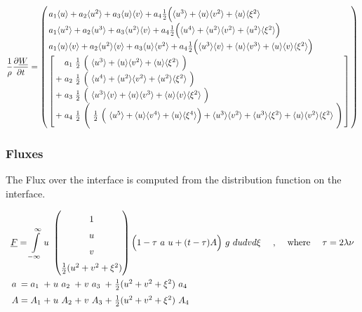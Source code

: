 \documentclass[
	pdftex,             %
	12pt,				%
	a4paper,		   	%
	english,				%
	oneside,			%
]{article}
\newcommand{\mom}[1]{\langle #1 \rangle}
\newcommand{\uu}[1]{\underline{#1}}
\begin{document}
\begin{equation}
\arraycolsep=1.4pt\def\arraystretch{1.5}
\dfrac{1}{\rho}\dfrac{\partial \uu{W}}{\partial t} = 
\left(
\begin{array}{l}
        a_1 \mom{u} + a_2 \mom{u^2} + a_3 \mom{u}\mom{v}
    +   a_4 \frac{1}{2} \Big( \mom{u^3} + \mom{u}\mom{v^2} + \mom{u}\mom{\xi^2}
    \\
        a_1 \mom{u^2} + a_2 \mom{u^3} + a_3 \mom{u^2}\mom{v}
    +   a_4 \frac{1}{2} \Big( \mom{u^4} + \mom{u^2}\mom{v^2} + \mom{u^2}\mom{\xi^2} \Big)
    \\
        a_1 \mom{u}\mom{v} + a_2 \mom{u^2}\mom{v} + a_3 \mom{u}\mom{v^2}
    +   a_4 \frac{1}{2} \Big( \mom{u^3}\mom{v} + \mom{u}\mom{v^3} + \mom{u}\mom{v}\mom{\xi^2} \Big)
    \\
    \left[
        \begin{array}{lcl}
             &a_1& \frac{1}{2}~ \Big(~ \mom{u^3} + \mom{u}\mom{v^2} + \mom{u}\mom{\xi^2} ~\Big) \\
            +&a_2& \frac{1}{2}~ \Big(~ \mom{u^4} + \mom{u^2}\mom{v^2} + \mom{u^2}\mom{\xi^2} ~\Big) \\
            +&a_3& \frac{1}{2}~ \Big(~ \mom{u^3}\mom{v} + \mom{u}\mom{v^3} + \mom{u}\mom{v}\mom{\xi^2} ~\Big) \\
            +&a_4& \frac{1}{2}~ \Bigg(~ \frac{1}{2}~
					\Big(~ \mom{u^5} + \mom{u}\mom{v^4} + \mom{u}\mom{\xi^4} \Big)
						 + \mom{u^3}\mom{v^2} + \mom{u^3}\mom{\xi^2} + \mom{u}\mom{v^2}\mom{\xi^2}
					~\Bigg)
        \end{array}
    \right]
\end{array}
\right)
\end{equation}

\subsubsection{Fluxes}

The Flux over the interface is computed from the distribution function on the interface. 

\begin{equation}
\begin{array}{l}
\uu{F} = 
\displaystyle \int \limits_{-\infty}^{\infty}
u~
\begin{pmatrix}
	1 \\ u \\ v \\ \frac{1}{2} (u^2 + v^2 + \xi^2)
\end{pmatrix}
\Big(
	1 - \tau~a~u + (t-\tau)A
\Big)
~g~ du dv d\xi
\textnormal{~~~~,~~~~where~~~~}
\tau = 2 \lambda \nu
\\
\arraycolsep=1.4pt\def\arraystretch{1.5}
\begin{array}{lclclclcl}
a &=& a_1 &+& u~a_2 &+& v~a_3 &+& \tfrac{1}{2} (u^2 + v^2 + \xi^2)~a_4
\\
A &=& A_1 &+& u~A_2 &+& v~A_3 &+& \tfrac{1}{2} (u^2 + v^2 + \xi^2)~A_4
\end{array}
\end{array}
\end{equation}
\end{document}
